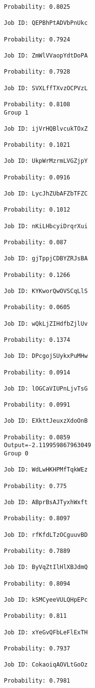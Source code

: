 \documentclass[11pt]{article}
\begin{document}
\begin{Verbatim}[commandchars=\\\{\}]
Probability: 0.8025

Job ID: QEPBhPtADVbPnUkc

Probability: 0.7924

Job ID: ZmWlVVaopYdtDoPA

Probability: 0.7928

Job ID: SVXLffTXvzOCPVzL

Probability: 0.8108
Group 1

Job ID: ijVrHQBlvcukTOxZ

Probability: 0.1021

Job ID: UkpWrMzrmLVGZjpY

Probability: 0.0916

Job ID: LycJhZUbAFZbTFZC

Probability: 0.1012

Job ID: nKiLHbcyiDrqrXui

Probability: 0.087

Job ID: gjTppjCDBYZRJsBA

Probability: 0.1266

Job ID: KYKworQwOVSCqLlS

Probability: 0.0605

Job ID: wQkLjZIHdfbZjlUv

Probability: 0.1374

Job ID: DPcgojSUykxPuMHw

Probability: 0.0914

Job ID: lOGCaVIUPnLjvTsG

Probability: 0.0991

Job ID: EXkttJeuxzXdoOnB

Probability: 0.0859
Output=-2.119959867963049
Group 0

Job ID: WdLwHKHPMfTqkWEz

Probability: 0.775

Job ID: ABprBsAJTyxhWxft

Probability: 0.8097

Job ID: rfKfdLTzOCguuvBD

Probability: 0.7889

Job ID: ByVqZtIlHlXBJdmQ

Probability: 0.8094

Job ID: kSMCyeeVULQHpEPc

Probability: 0.811

Job ID: xYeGvQFbLeFlExTH

Probability: 0.7937

Job ID: CokaoiqAOVLtGoOz

Probability: 0.7981


\end{Verbatim}
\end{document}

